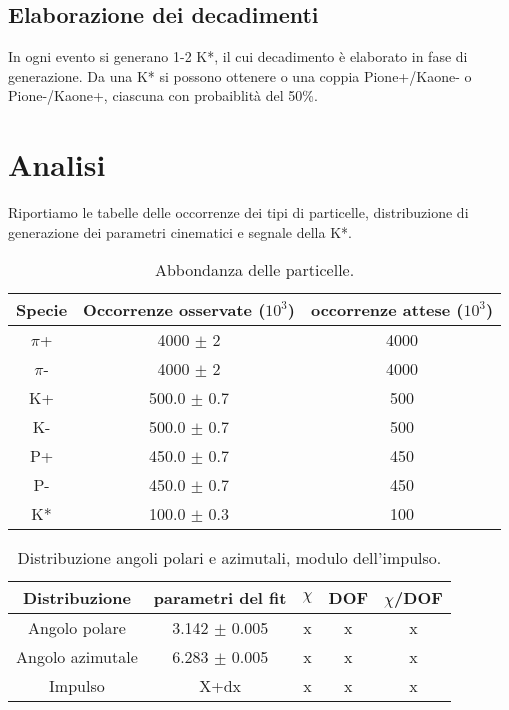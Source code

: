 \documentclass[12pt, a4paper]{article}
\begin{document}
\subsection{Elaborazione dei decadimenti}
In ogni evento si generano 1-2 K*, il cui decadimento è elaborato in fase di generazione.
Da una K* si possono ottenere o una coppia Pione+/Kaone- o Pione-/Kaone+, ciascuna con probaiblità del 50\%.


\section{Analisi}
Riportiamo le tabelle delle occorrenze dei tipi di particelle, distribuzione di generazione dei parametri cinematici e segnale della K*.

\begin{table}[H]
  \begin{center}
    \caption{Abbondanza delle particelle.}
    \label{tab:table1}
    \begin{tabular}{c|c|c} %
      \textbf{Specie} & 
      \textbf{Occorrenze osservate ($10^3$)} & 
      \textbf{occorrenze attese ($10^3$)}\\
      
      \hline
      $\pi$+ & 4000 $\pm$ 2 & 4000\\
      $\pi$- & 4000 $\pm$ 2 & 4000\\
      K+ 	 & 500.0 $\pm$ 0.7 & 500\\
      K- 	 & 500.0 $\pm$ 0.7 & 500\\
      P+ 	 & 450.0 $\pm$ 0.7  & 450\\
      P- 	 & 450.0 $\pm$ 0.7 & 450\\
      K* 	 & 100.0 $\pm$ 0.3 & 100\\
     

    \end{tabular}
  \end{center}
\end{table}

\begin{table}[H]
  \begin{center}
    \caption{Distribuzione angoli polari e azimutali, modulo dell'impulso.}
    \label{tab:table2}
    \begin{tabular}{c|c|c|c|c} %
      \textbf{Distribuzione} & \textbf{parametri del fit} & \textbf{$\chi$} & \textbf{DOF} & \textbf{$\chi$/DOF}\\
      \hline
      Angolo polare & 3.142 $\pm$ 0.005 & x & x & x\\
      Angolo azimutale & 6.283 $\pm$ 0.005 & x & x & x \\
      Impulso & X+dx & x & x & x\\
    \end{tabular}
  \end{center}
\end{table}
\end{document}
